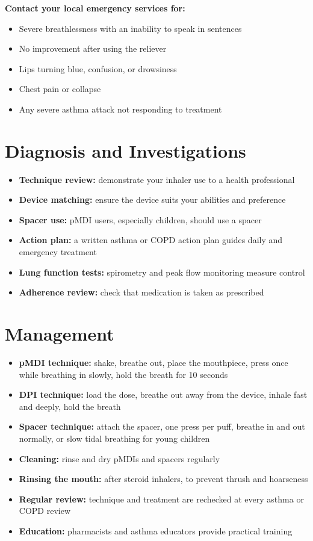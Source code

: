 \textbf{Contact your local emergency services for:}
\begin{itemize}
    \item Severe breathlessness with an inability to speak in sentences
    \item No improvement after using the reliever
    \item Lips turning blue, confusion, or drowsiness
    \item Chest pain or collapse
    \item Any severe asthma attack not responding to treatment
\end{itemize}

\section*{Diagnosis and Investigations}
\begin{itemize}
    \item \textbf{Technique review:} demonstrate your inhaler use to a health professional
    \item \textbf{Device matching:} ensure the device suits your abilities and preference
    \item \textbf{Spacer use:} pMDI users, especially children, should use a spacer
    \item \textbf{Action plan:} a written asthma or COPD action plan guides daily and emergency treatment
    \item \textbf{Lung function tests:} spirometry and peak flow monitoring measure control
    \item \textbf{Adherence review:} check that medication is taken as prescribed
\end{itemize}

\section*{Management}
\begin{itemize}
    \item \textbf{pMDI technique:} shake, breathe out, place the mouthpiece, press once while breathing in slowly, hold the breath for 10 seconds
    \item \textbf{DPI technique:} load the dose, breathe out away from the device, inhale fast and deeply, hold the breath
    \item \textbf{Spacer technique:} attach the spacer, one press per puff, breathe in and out normally, or slow tidal breathing for young children
    \item \textbf{Cleaning:} rinse and dry pMDIs and spacers regularly
    \item \textbf{Rinsing the mouth:} after steroid inhalers, to prevent thrush and hoarseness
    \item \textbf{Regular review:} technique and treatment are rechecked at every asthma or COPD review
    \item \textbf{Education:} pharmacists and asthma educators provide practical training
\end{itemize}

